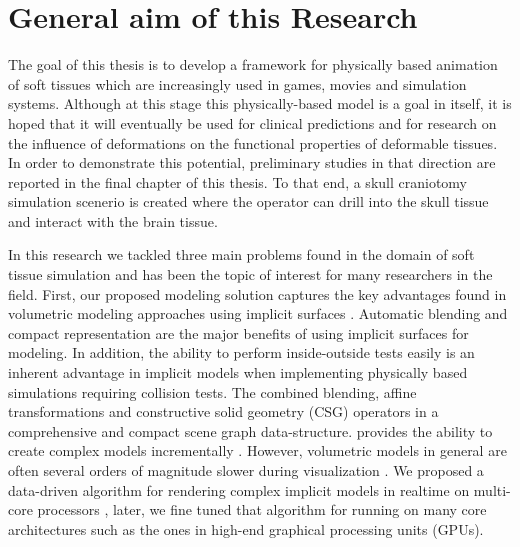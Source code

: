 

\label{chapter:introduction}
\section{General aim of this Research}
The goal of this thesis is to develop a framework for physically based animation of soft tissues which are increasingly used in
games, movies and simulation systems. Although at this stage this physically-based model is a goal in itself, it is hoped that
it will eventually be used for clinical predictions and for research on the influence of deformations on the functional properties 
of deformable tissues. In order to demonstrate this potential, preliminary studies in that direction are reported in the final chapter
of this thesis. To that end, a skull craniotomy simulation scenerio is created where the operator can drill into the skull tissue and interact 
with the brain tissue. 

In this research we tackled three main problems found in the domain of soft tissue simulation and has been the topic of interest for many
researchers in the field. First, our proposed modeling solution captures the key advantages found in volumetric modeling approaches using 
implicit surfaces \cite{Bloomenthal1997, Wyvill1986, Wyvill1999, Wyvill1996, Wyvill1997, Schmidt2006, Bernhardt2010a}. Automatic blending and compact 
representation are the major benefits of using implicit surfaces for modeling. In addition, the ability to perform inside-outside tests 
easily is an inherent advantage in implicit models when implementing physically based simulations requiring collision tests. 
The \blob \cite{Wyvill1999} combined blending, affine transformations and constructive solid geometry (CSG) operators in a 
comprehensive and compact scene graph data-structure. \blob provides the ability to create complex models incrementally \cite{Schmidt2006}. 
However, volumetric models in general are often several orders of magnitude slower during visualization \cite{Bloomenthal1990a, Bloomenthal1997}.
We proposed a data-driven algorithm for rendering complex implicit models in realtime on multi-core processors \cite{Shirazian2012}, later, we 
fine tuned that algorithm for running on many core architectures such as the ones in high-end graphical processing units (GPUs). 

